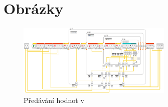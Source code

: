 \chapter{Obrázky}

\begin{figure}[h]
	\centering
	\includegraphics[angle=-90,origin=c,width=280px]{images/lego-soft/lego-soft_legolib_match_array_length.png}
	\caption[Předávání hodnot v \legoSW{}]{Předávání hodnot v \legoSW{}}
	\label{fig:lego-soft_legolib_match_array_length}
\end{figure}




